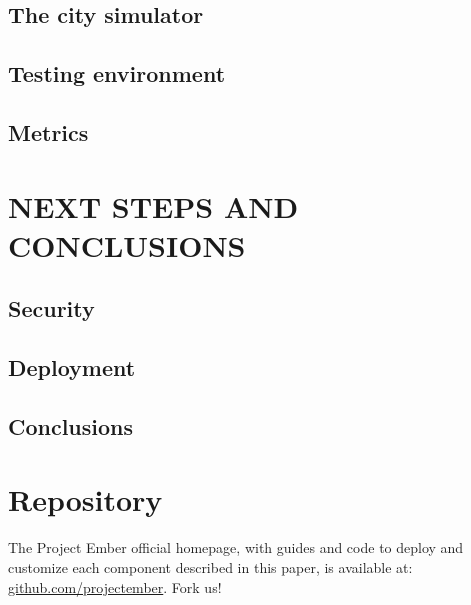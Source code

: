 \subsection{The city simulator}

\subsection{Testing environment}

\subsection{Metrics}



\section{NEXT STEPS AND CONCLUSIONS}

\subsection{Security}

\subsection{Deployment}

\subsection{Conclusions}

\section*{Repository}
The Project Ember official homepage, with guides and code to deploy and customize each component described in this paper, is available at: \href{https://github.com/projectember}{github.com/projectember}. Fork us!

